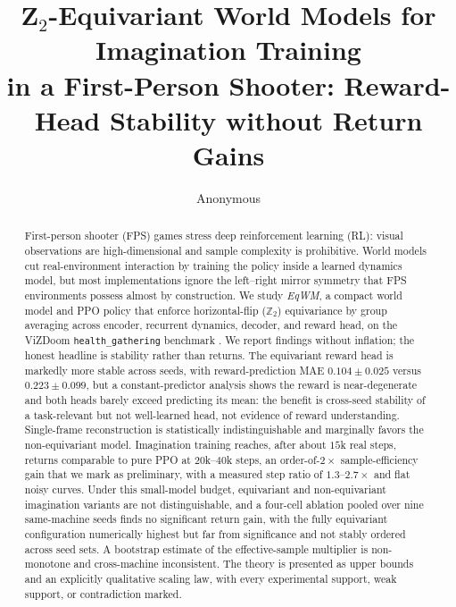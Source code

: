 \documentclass[sigconf,anonymous]{acmart}
\begin{document}
\title{Z$_2$-Equivariant World Models for Imagination Training\\
in a First-Person Shooter: Reward-Head Stability without Return Gains}

\author{Anonymous}

\begin{abstract}
First-person shooter (FPS) games stress deep reinforcement learning (RL):
visual observations are high-dimensional and sample complexity is
prohibitive. World models cut real-environment interaction by training the
policy inside a learned dynamics model, but most implementations ignore the
left--right mirror symmetry that FPS environments possess almost by
construction. We study \emph{EqWM}, a compact world model and PPO policy that
enforce horizontal-flip ($\mathbb Z_2$) equivariance by group averaging across
encoder, recurrent dynamics, decoder, and reward head, on the ViZDoom
\texttt{health\_gathering} benchmark \cite{vizdoom2016}. We report findings
without inflation; the honest headline is stability rather than returns. The
equivariant reward head is markedly more stable across seeds, with
reward-prediction MAE $0.104\pm0.025$ versus $0.223\pm0.099$, but a
constant-predictor analysis shows the reward is near-degenerate and both
heads barely exceed predicting its mean: the benefit is cross-seed stability
of a task-relevant but not well-learned head, not evidence of reward
understanding. Single-frame reconstruction is statistically indistinguishable
and marginally favors the non-equivariant model. Imagination training reaches,
after about $15$k real steps, returns comparable to pure PPO at $20$k--$40$k
steps, an order-of-$2\times$ sample-efficiency gain that we mark as
preliminary, with a measured step ratio of $1.3$--$2.7\times$ and flat noisy
curves. Under this small-model budget, equivariant and non-equivariant
imagination variants are not distinguishable, and a four-cell ablation pooled
over nine same-machine seeds finds no significant return gain, with the fully
equivariant configuration numerically highest but far from significance and
not stably ordered across seed sets. A
bootstrap estimate of the effective-sample multiplier is non-monotone and
cross-machine inconsistent. The theory is presented as upper bounds and an
explicitly qualitative scaling law, with every experimental support, weak
support, or contradiction marked.
\end{abstract}

\end{document}
